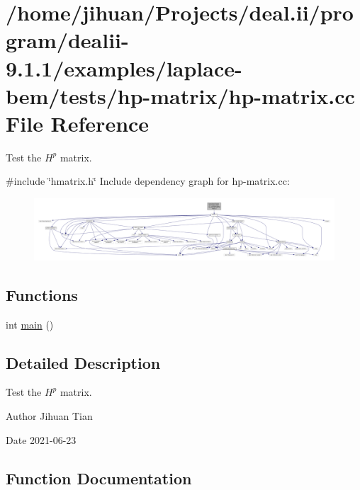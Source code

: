 \hypertarget{hp-matrix_8cc}{}\section{/home/jihuan/\+Projects/deal.ii/program/dealii-\/9.1.1/examples/laplace-\/bem/tests/hp-\/matrix/hp-\/matrix.cc File Reference}
\label{hp-matrix_8cc}


Test the $H^p$ matrix.  


{\ttfamily \#include \char`\"{}hmatrix.\+h\char`\"{}}\newline
Include dependency graph for hp-\/matrix.cc\+:
\nopagebreak
\begin{figure}[H]
\begin{center}
\leavevmode
\includegraphics[width=350pt]{hp-matrix_8cc__incl}
\end{center}
\end{figure}
\subsection*{Functions}
\begin{DoxyCompactItemize}
\item 
int \hyperlink{hp-matrix_8cc_ae66f6b31b5ad750f1fe042a706a4e3d4}{main} ()
\end{DoxyCompactItemize}


\subsection{Detailed Description}
Test the $H^p$ matrix. 

\begin{DoxyAuthor}{Author}
Jihuan Tian 
\end{DoxyAuthor}
\begin{DoxyDate}{Date}
2021-\/06-\/23 
\end{DoxyDate}


\subsection{Function Documentation}
\mbox{\label{hp-matrix_8cc_ae66f6b31b5ad750f1fe042a706a4e3d4}} 
